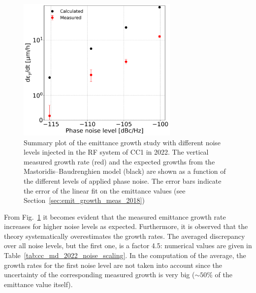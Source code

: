 \begin{figure}[!h]
   \centering         
   \includegraphics[width=0.7\textwidth]{images/Ch8/emit_V_background_subtracted_noise_scan.png}
       \caption{Summary plot of the emittance growth study with different noise levels injected in the RF system of CC1 in 2022. The vertical measured growth rate (red) and the expected growths from the Mastoridis--Baudrenghien model (black) are shown as a function of the different levels of applied phase noise. The error bars indicate the error of the linear fit on the emittance values (see Section~\ref{sec:emit_growth_meas_2018})}
       \label{fig:V_emit_growth_background_subtracted_noise_scan}
\end{figure}

From Fig.~\ref{fig:V_emit_growth_background_subtracted_noise_scan} it becomes evident that the measured emittance growth rate increases for higher noise levels as expected. Furthermore, it is observed that the theory systematically overestimates the growth rates. The averaged discrepancy over all noise levels, but the first one, is a factor 4.5: numerical values are given in Table~\ref{tab:cc_md_2022_noise_scaling}. In the computation of the average, the growth rates for the first noise level are not taken into account since the uncertainty of the corresponding measured growth is very big ($\sim 50\%$ of the emittance value itself).

